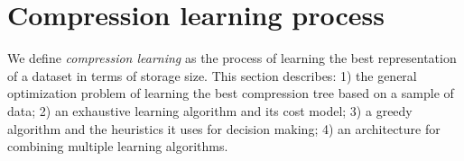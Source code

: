 \section{Compression learning process}





% 

We define \textit{compression learning} as the process of learning the best representation of a dataset in terms of storage size. This section describes: 1) the general optimization problem of learning the best compression tree  based on a sample of data; 2) an exhaustive learning algorithm and its cost model; 3) a greedy algorithm and the heuristics it uses for decision making; 4) an architecture for combining multiple learning algorithms.












\iffalse
TODO-1-1: result: worse than iterative learning since it misses multi-column opportunities
TODO-1-2: advantage: faster execution (one column at a time; suitable for columnar storage)
TODO-2: comparison with the other algorithms & improvements brought to OR by them
\fi



